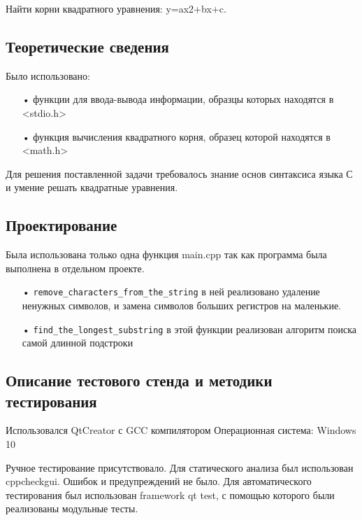 \documentclass[12pt,a4paper]{report}
\begin{document}
Найти корни квадратного уравнения: y=ax2+bx+c.

\subsection{Теоретические сведения}

Было использовано:
\begin{enumerate}
\item[•] функции для ввода-вывода информации, образцы которых находятся в <stdio.h>
\item[•] функция вычисления квадратного корня, образец которой находятся в <math.h>
\end{enumerate}

Для решения поставленной задачи требовалось знание основ синтаксиса языка С и умение решать квадратные уравнения.



\subsection{Проектирование}

Была использована только одна функция main.cpp так как программа была выполнена в отдельном проекте.


\begin{enumerate}
\item[•] \verb-remove_characters_from_the_string- в ней реализовано удаление ненужных символов, и замена символов больших регистров на маленькие.
\item[•] \verb-find_the_longest_substring- в этой функции реализован алгоритм поиска самой длинной подстроки
\end{enumerate}

\subsection{Описание тестового стенда и методики тестирования}
Использовался QtCreator с GCC компилятором
Операционная система: Windows 10


Ручное тестирование присутствовало.
Для статического анализа был использован cppcheckgui. Ошибок и предупреждений не было.
Для автоматического тестирования был использован framework qt test, с помощью которого были реализованы модульные тесты.
\end{document}
